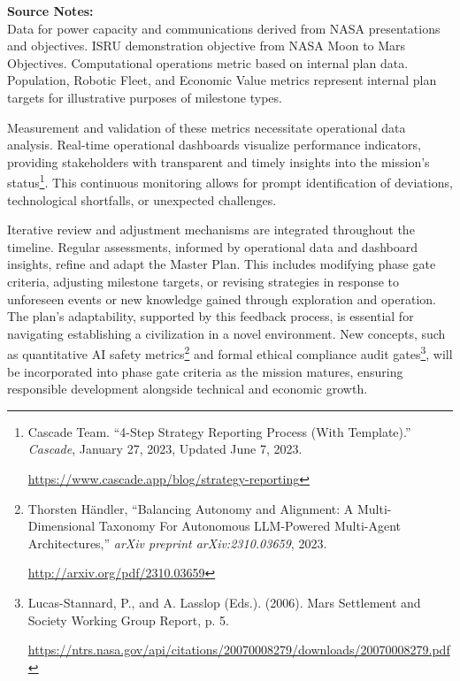 \documentclass[fontsize=10pt, oneside, DIV=calc]{scrartcl}
\begin{document}
\noindent\footnotesize
\textbf{Source Notes:}\\[0.5em]
Data for power capacity and communications derived from NASA presentations and objectives. ISRU demonstration objective from NASA Moon to Mars Objectives. Computational operations metric based on internal plan data. Population, Robotic Fleet, and Economic Value metrics represent internal plan targets for illustrative purposes of milestone types.\\[1em]

\medskip

\noindent
Measurement and validation of these metrics necessitate operational data analysis. Real-time operational dashboards visualize performance indicators, providing stakeholders with transparent and timely insights into the mission's status\footnote{Cascade Team. ``4-Step Strategy Reporting Process (With Template).'' \textit{Cascade}, January 27, 2023, Updated June 7, 2023. 







\href{https://www.cascade.app/blog/strategy-reporting}\url{https://www.cascade.app/blog/strategy-reporting}}. This continuous monitoring allows for prompt identification of deviations, technological shortfalls, or unexpected challenges.

\medskip

\noindent
Iterative review and adjustment mechanisms are integrated throughout the timeline. Regular assessments, informed by operational data and dashboard insights, refine and adapt the Master Plan. This includes modifying phase gate criteria, adjusting milestone targets, or revising strategies in response to unforeseen events or new knowledge gained through exploration and operation. The plan's adaptability, supported by this feedback process, is essential for navigating establishing a civilization in a novel environment. New concepts, such as quantitative AI safety metrics\footnote{Thorsten Händler, ``Balancing Autonomy and Alignment: A Multi-Dimensional Taxonomy For Autonomous LLM-Powered Multi-Agent Architectures,'' \textit{arXiv preprint arXiv:2310.03659}, 2023. 







\href{http://arxiv.org/pdf/2310.03659}\url{http://arxiv.org/pdf/2310.03659}} and formal ethical compliance audit gates\footnote{Lucas-Stannard, P., and A. Lasslop (Eds.). (2006). Mars Settlement and Society Working Group Report, p. 5. 







\href{https://ntrs.nasa.gov/api/citations/20070008279/downloads/20070008279.pdf}\url{https://ntrs.nasa.gov/api/citations/20070008279/downloads/20070008279.pdf}}, will be incorporated into phase gate criteria as the mission matures, ensuring responsible development alongside technical and economic growth.
\end{document}
